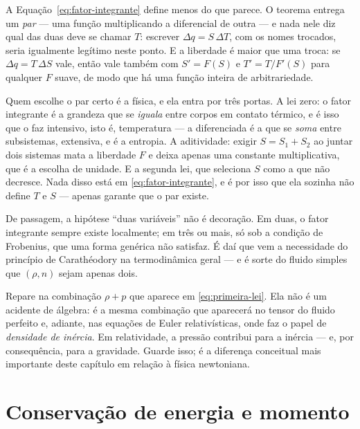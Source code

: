 \documentclass[12pt,a4paper,oneside]{book}
\theoremstyle{rgplain}
\theoremstyle{rgremark}
\begin{document}
\begin{atencao}
A Equação~\eqref{eq:fator-integrante} define menos do que parece. O teorema entrega um \emph{par} --- uma função
multiplicando a diferencial de outra --- e nada nele diz qual das duas deve se
chamar $T$: escrever $\Delta q=S\,\Delta T$, com os nomes trocados, seria
igualmente legítimo neste ponto. E a liberdade é maior que uma troca: se
$\Delta q=T\,\Delta S$ vale, então vale também com $S'=F(S)$ e $T'=T/F'(S)$
para qualquer $F$ suave, de modo que há uma função inteira de arbitrariedade.

Quem escolhe o par certo é a física, e ela entra por três portas. A lei zero:
o fator integrante é a grandeza que se \emph{iguala} entre corpos em contato
térmico, e é isso que o faz intensivo, isto é, temperatura --- a diferenciada
é a que se \emph{soma} entre subsistemas, extensiva, e é a entropia. A
aditividade: exigir $S=S_1+S_2$ ao juntar dois sistemas mata a liberdade $F$ e
deixa apenas uma constante multiplicativa, que é a escolha de unidade. E a
segunda lei, que seleciona $S$ como a que não decresce. Nada disso está em
\eqref{eq:fator-integrante}, e é por isso que ela sozinha não define $T$ e $S$
--- apenas garante que o par existe.

De passagem, a hipótese ``duas variáveis'' não é decoração. Em duas, o fator
integrante sempre existe localmente; em três ou mais, só sob a condição de
Frobenius, que uma forma genérica não satisfaz. É daí que vem a necessidade
do princípio de Carathéodory na termodinâmica geral --- e é sorte do fluido
simples que $(\rho,n)$ sejam apenas dois.
\end{atencao}

\begin{central}
Repare na combinação $\rho+p$ que aparece em \eqref{eq:primeira-lei}. Ela não
é um acidente de álgebra: é a mesma combinação que aparecerá no tensor do
fluido perfeito e, adiante, nas equações de Euler relativísticas, onde faz o
papel de \emph{densidade de inércia}. Em relatividade, a pressão contribui
para a inércia --- e, por consequência, para a gravidade. Guarde isso; é a
diferença conceitual mais importante deste capítulo em relação à física
newtoniana.
\end{central}

\section{Conservação de energia e momento}
\label{sec:conservacao-T}
\end{document}
